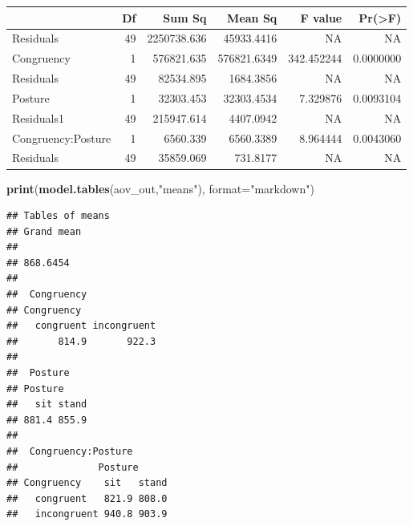 \documentclass[
]{book}
\newenvironment{Shaded}{\begin{snugshade}}{\end{snugshade}}
\newcommand{\AttributeTok}[1]{\textcolor[rgb]{0.13,0.29,0.53}{#1}}
\newcommand{\CommentTok}[1]{\textcolor[rgb]{0.56,0.35,0.01}{\textit{#1}}}
\newcommand{\FunctionTok}[1]{\textcolor[rgb]{0.13,0.29,0.53}{\textbf{#1}}}
\newcommand{\NormalTok}[1]{#1}
\newcommand{\OtherTok}[1]{\textcolor[rgb]{0.56,0.35,0.01}{#1}}
\newcommand{\SpecialCharTok}[1]{\textcolor[rgb]{0.81,0.36,0.00}{\textbf{#1}}}
\newcommand{\StringTok}[1]{\textcolor[rgb]{0.31,0.60,0.02}{#1}}
\begin{document}
\begin{Shaded}
\end{Shaded}

\begin{tabular}{l|r|r|r|r|r}
\hline
  & Df & Sum Sq & Mean Sq & F value & Pr(>F)\\
\hline
Residuals & 49 & 2250738.636 & 45933.4416 & NA & NA\\
\hline
Congruency & 1 & 576821.635 & 576821.6349 & 342.452244 & 0.0000000\\
\hline
Residuals & 49 & 82534.895 & 1684.3856 & NA & NA\\
\hline
Posture & 1 & 32303.453 & 32303.4534 & 7.329876 & 0.0093104\\
\hline
Residuals1 & 49 & 215947.614 & 4407.0942 & NA & NA\\
\hline
Congruency:Posture & 1 & 6560.339 & 6560.3389 & 8.964444 & 0.0043060\\
\hline
Residuals & 49 & 35859.069 & 731.8177 & NA & NA\\
\hline
\end{tabular}

\begin{Shaded}
\begin{Highlighting}[]
\FunctionTok{print}\NormalTok{(}\FunctionTok{model.tables}\NormalTok{(aov\_out,}\StringTok{"means"}\NormalTok{), }\AttributeTok{format=}\StringTok{"markdown"}\NormalTok{)}
\end{Highlighting}
\end{Shaded}

\begin{verbatim}
## Tables of means
## Grand mean
##          
## 868.6454 
## 
##  Congruency 
## Congruency
##   congruent incongruent 
##       814.9       922.3 
## 
##  Posture 
## Posture
##   sit stand 
## 881.4 855.9 
## 
##  Congruency:Posture 
##              Posture
## Congruency    sit   stand
##   congruent   821.9 808.0
##   incongruent 940.8 903.9
\end{verbatim}
\end{document}
